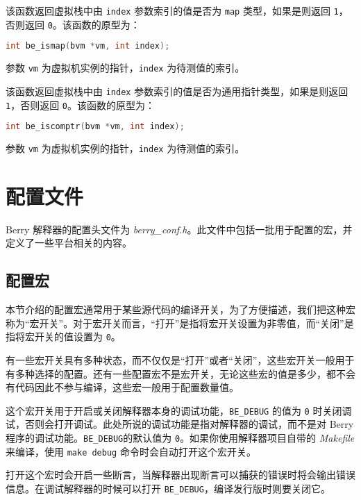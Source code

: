 
该函数返回虚拟栈中由 \texttt{index} 参数索引的值是否为 \texttt{map} 类型，如果是则返回 \texttt{1}，否则返回 \texttt{0}。该函数的原型为：
\begin{lstlisting}[language=c, style=berry, numbers=none]
int be_ismap(bvm *vm, int index);
\end{lstlisting}
参数 \texttt{vm} 为虚拟机实例的指针，\texttt{index} 为待测值的索引。


该函数返回虚拟栈中由 \texttt{index} 参数索引的值是否为通用指针类型，如果是则返回 \texttt{1}，否则返回 \texttt{0}。该函数的原型为：
\begin{lstlisting}[language=c, style=berry, numbers=none]
int be_iscomptr(bvm *vm, int index);
\end{lstlisting}
参数 \texttt{vm} 为虚拟机实例的指针，\texttt{index} 为待测值的索引。

\section{配置文件}

Berry 解释器的配置头文件为 \emph{berry\_conf.h}。此文件中包括一批用于配置的宏，并定义了一些平台相关的内容。

\subsection{配置宏}

本节介绍的配置宏通常用于某些源代码的编译开关，为了方便描述，我们把这种宏称为``宏开关''。对于宏开关而言，``打开''是指将宏开关设置为非零值，而``关闭''是指将宏开关的值设置为 \texttt{0}。

有一些宏开关具有多种状态，而不仅仅是``打开''或者``关闭''，这些宏开关一般用于有多种选择的配置。还有一些配置宏不是宏开关，无论这些宏的值是多少，都不会有代码因此不参与编译，这些宏一般用于配置数量值。

 \label{section::BE_DEBUG}

这个宏开关用于开启或关闭解释器本身的调试功能，\texttt{BE\_DEBUG} 的值为 \texttt{0} 时关闭调试，否则会打开调试。此处所说的调试功能是指对解释器的调试，而不是对 Berry 程序的调试功能。\texttt{BE\_DEBUG}的默认值为 \texttt{0}。如果你使用解释器项目自带的 \emph{Makefile} 来编译，使用 \texttt{make debug} 命令时会自动打开这个宏开关。

打开这个宏时会开启一些断言，当解释器出现断言可以捕获的错误时将会输出错误信息。在调试解释器的时候可以打开 \texttt{BE\_DEBUG}，编译发行版时则要关闭它。


